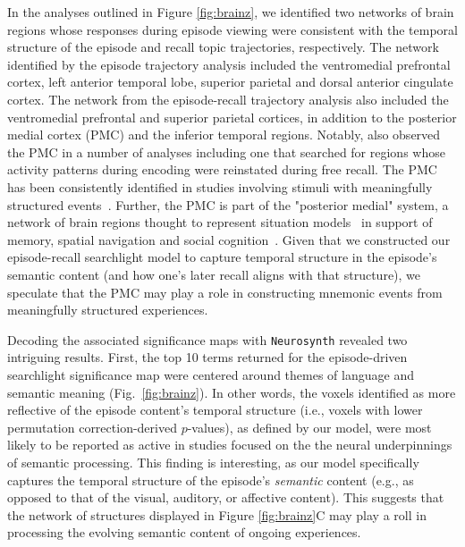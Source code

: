In the analyses outlined in Figure \ref{fig:brainz}, we identified two networks of brain regions whose responses during episode viewing were consistent with the temporal structure of the episode and recall topic trajectories, respectively. The network identified by the episode trajectory analysis included the ventromedial prefrontal cortex, left anterior temporal lobe, superior parietal and dorsal anterior cingulate cortex. The network from the episode-recall trajectory analysis also included the ventromedial prefrontal and superior parietal cortices, in addition to the posterior medial cortex (PMC) and the inferior temporal regions. Notably, \cite{ChenEtal17} also observed the PMC in a number of analyses including one that searched for regions whose activity patterns during encoding were reinstated during free recall. The PMC has been consistently identified in studies involving stimuli with meaningfully structured events~\citep{CohnRang17}. Further, the PMC is part of the "posterior medial" system, a network of brain regions thought to represent situation models~\citep{ZackEtal07} in support of memory, spatial navigation and social cognition~\citep{RangRitc12}. Given that we constructed our episode-recall searchlight model to capture temporal structure in the episode's semantic content (and how one's later recall aligns with that structure), we speculate that the PMC may play a role in constructing mnemonic events from meaningfully structured experiences.

Decoding the associated significance maps with \texttt{Neurosynth} revealed two intriguing results.  First, the top 10 terms returned for the episode-driven searchlight significance map were centered around themes of language and semantic meaning (Fig.~\ref{fig:brainz}).  In other words, the voxels identified as more reflective of the episode content's temporal structure (i.e., voxels with lower permutation correction-derived $p$-values), as defined by our model, were most likely to be reported as active in studies focused on the the neural underpinnings of semantic processing.  This finding is interesting, as our model specifically captures the temporal structure of the episode's \textit{semantic} content (e.g., as opposed to that of the visual, auditory, or affective content).  This suggests that the network of structures displayed in Figure \ref{fig:brainz}C may play a roll in processing the evolving semantic content of ongoing experiences.


